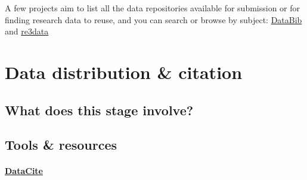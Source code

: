 \documentclass{tufte-handout}
\begin{document}
A few projects aim to list all the data repositories available for
submission or for finding research data to reuse, and you can search or
browse by subject: \href{http://databib.org/}{DataBib} and \href{http://www.re3data.org}{re3data}


\section{Data distribution \& citation}\label{data-distribution-citation} 

\subsection{What does this stage
involve?}\label{what-does-this-stage-involve-1}

\subsection{Tools \& resources}\label{what-tools-and-resources-are-available-3}

\paragraph{\href{https://www.datacite.org/}{DataCite}}\label{datacite}
\end{document}
